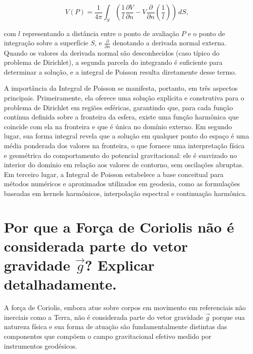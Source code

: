 \[
V(P) = \frac{1}{4\pi} \int_S \left( \frac{1}{l} \frac{\partial V}{\partial n} - V \frac{\partial}{\partial n} \left( \frac{1}{l} \right) \right) \, dS \text{,}
\]

com \( l \) representando a distância entre o ponto de avaliação \( P \) e o ponto de integração sobre a superfície \( S \), e \( \frac{\partial}{\partial n} \) denotando a derivada normal externa. Quando os valores da derivada normal são desconhecidos (caso típico do problema de Dirichlet), a segunda parcela do integrando é suficiente para determinar a solução, e a integral de Poisson resulta diretamente desse termo.

A importância da Integral de Poisson se manifesta, portanto, em três aspectos principais. Primeiramente, ela oferece uma solução explícita e construtiva para o problema de Dirichlet em regiões esféricas, garantindo que, para cada função contínua definida sobre a fronteira da esfera, existe uma função harmônica que coincide com ela na fronteira e que é única no domínio externo. Em segundo lugar, sua forma integral revela que a solução em qualquer ponto do espaço é uma média ponderada dos valores na fronteira, o que fornece uma interpretação física e geométrica do comportamento do potencial gravitacional: ele é suavizado no interior do domínio em relação aos valores de contorno, sem oscilações abruptas. Em terceiro lugar, a Integral de Poisson estabelece a base conceitual para métodos numéricos e aproximados utilizados em geodesia, como as formulações baseadas em kernels harmônicos, interpolação espectral e continuação harmônica.


\section{Por que a Força de Coriolis não é considerada parte do vetor gravidade $\vec{g}$? Explicar detalhadamente.}

A força de Coriolis, embora atue sobre corpos em movimento em referenciais não inerciais como a Terra, não é considerada parte do vetor gravidade \( \vec{g} \) porque sua natureza física e sua forma de atuação são fundamentalmente distintas das componentes que compõem o campo gravitacional efetivo medido por instrumentos geodésicos.

